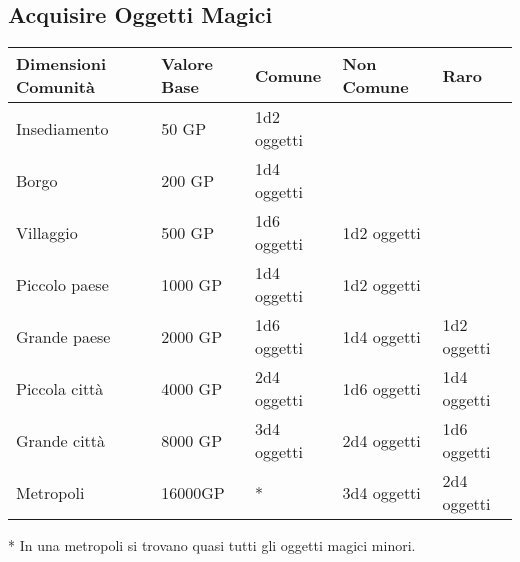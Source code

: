 \documentclass[12pt,a4paper,twoside,openany]{book}
\begin{document}
\subsection{Acquisire Oggetti Magici}

\label{acquisire-oggetti-magici}

\bigskip

\begin{tabular}{lllll}
\textbf{Dimensioni Comunità} & \textbf{Valore Base} & \textbf{Comune} & \textbf{Non Comune} & \textbf{Raro}\\
\toprule
Insediamento  & 50 GP & 1d2 oggetti && \\
Borgo & 200 GP& 1d4 oggetti && \\
Villaggio & 500 GP& 1d6 oggetti & 1d2 oggetti  & \\
Piccolo paese & 1000 GP & 1d4 oggetti & 1d2 oggetti  & \\
Grande paese  & 2000 GP & 1d6 oggetti & 1d4 oggetti  & 1d2 oggetti\\
Piccola città & 4000 GP & 2d4 oggetti & 1d6 oggetti  & 1d4 oggetti\\
Grande città  & 8000 GP & 3d4 oggetti  & 2d4 oggetti  & 1d6 oggetti\\
Metropoli & 16000GP  & {*} & 3d4 oggetti  & 2d4 oggetti\\
\end{tabular}

{*} In una metropoli si trovano quasi tutti gli oggetti magici minori.
\end{document}
